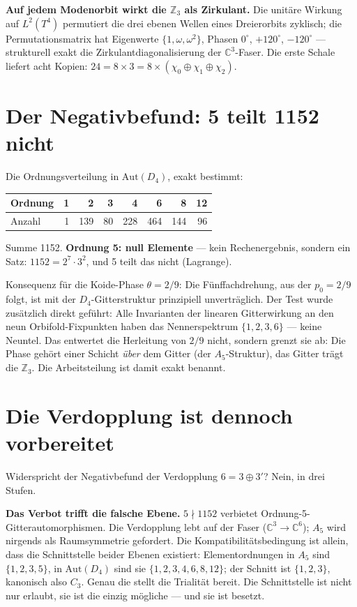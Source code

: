 \textbf{Auf jedem Modenorbit wirkt die $\mathbb{Z}_3$ als Zirkulant.}
Die unitäre Wirkung auf $L^2(T^4)$ permutiert die drei ebenen Wellen
eines Dreierorbits zyklisch; die Permutationsmatrix hat Eigenwerte
$\{1,\omega,\omega^2\}$, Phasen $0^\circ$, $+120^\circ$, $-120^\circ$
--- strukturell exakt die Zirkulantdiagonalisierung der
$\mathbb{C}^3$-Faser. Die erste Schale liefert acht Kopien:
$24 = 8\times3 = 8\times(\chi_0\oplus\chi_1\oplus\chi_2)$.

\section{Der Negativbefund: 5 teilt 1152 nicht}

Die Ordnungsverteilung in $\mathrm{Aut}(D_4)$, exakt bestimmt:
\begin{center}
\small
\begin{tabular}{lrrrrrrr}
\toprule
Ordnung & 1 & 2 & 3 & 4 & 6 & 8 & 12 \\
\midrule
Anzahl & 1 & 139 & 80 & 228 & 464 & 144 & 96 \\
\bottomrule
\end{tabular}
\end{center}
Summe 1152. \textbf{Ordnung 5: null Elemente} --- kein Rechenergebnis,
sondern ein Satz: $1152 = 2^7\cdot3^2$, und 5 teilt das nicht
(Lagrange).

Konsequenz für die Koide-Phase $\theta = 2/9$: Die Fünffachdrehung, aus
der $p_0 = 2/9$ folgt, ist mit der $D_4$-Gitterstruktur prinzipiell
unverträglich. Der Test wurde zusätzlich direkt geführt: Alle
Invarianten der linearen Gitterwirkung an den neun Orbifold-Fixpunkten
haben das Nennerspektrum $\{1,2,3,6\}$ --- keine Neuntel. Das entwertet
die Herleitung von $2/9$ nicht, sondern grenzt sie ab: Die Phase gehört
einer Schicht \emph{über} dem Gitter (der $A_5$-Struktur), das Gitter
trägt die $\mathbb{Z}_3$. Die Arbeitsteilung ist damit exakt benannt.

\section{Die Verdopplung ist dennoch vorbereitet}

Widerspricht der Negativbefund der Verdopplung $6 = 3\oplus3'$? Nein,
in drei Stufen.

\textbf{Das Verbot trifft die falsche Ebene.} $5\nmid1152$ verbietet
Ordnung-5-Gitterautomorphismen. Die Verdopplung lebt auf der Faser
($\mathbb{C}^3\to\mathbb{C}^6$); $A_5$ wird nirgends als Raumsymmetrie
gefordert. Die Kompatibilitätsbedingung ist allein, dass die
Schnittstelle beider Ebenen existiert: Elementordnungen in $A_5$ sind
$\{1,2,3,5\}$, in $\mathrm{Aut}(D_4)$ sind sie $\{1,2,3,4,6,8,12\}$; der
Schnitt ist $\{1,2,3\}$, kanonisch also $C_3$. Genau die stellt die
Trialität bereit. Die Schnittstelle ist nicht nur erlaubt, sie ist die
einzig mögliche --- und sie ist besetzt.

